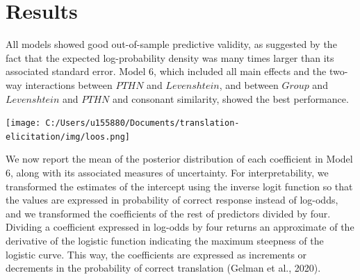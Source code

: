 \documentclass[
  english,
  man,floatsintext]{apa7}
\begin{document}
\hypertarget{results}{%
\section{Results}\label{results}}

All models showed good out-of-sample predictive validity, as suggested by the fact that the expected log-probability density was many times larger than its associated standard error. Model 6, which included all main effects and the two-way interactions between \(PTHN\) and \(Levenshtein\), and between \(Group\) and \(Levenshtein\) and \(PTHN\) and consonant similarity, showed the best performance.

\texttt{[image: C:/Users/u155880/Documents/translation-elicitation/img/loos.png]}

We now report the mean of the posterior distribution of each coefficient in Model 6, along with its associated measures of uncertainty. For interpretability, we transformed the estimates of the intercept using the inverse logit function so that the values are expressed in probability of correct response instead of log-odds, and we transformed the coefficients of the rest of predictors divided by four. Dividing a coefficient expressed in log-odds by four returns an approximate of the derivative of the logistic function indicating the maximum steepness of the logistic curve. This way, the coefficients are expressed as increments or decrements in the probability of correct translation (Gelman et al., 2020).
\end{document}
